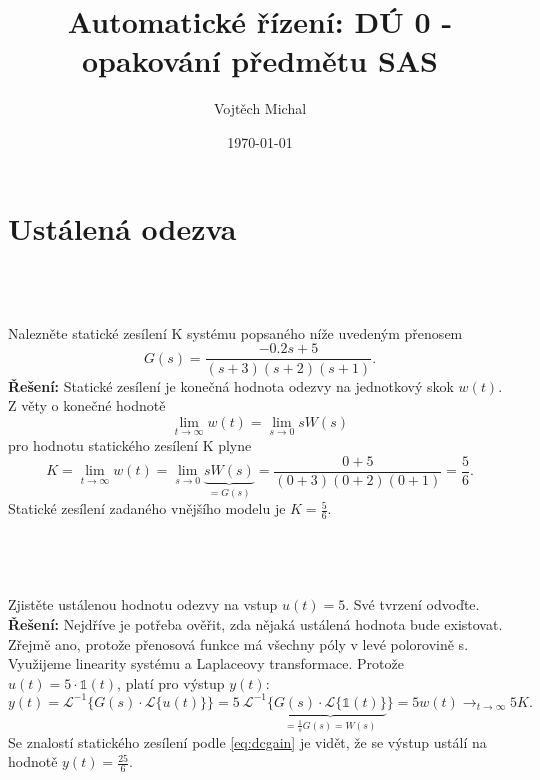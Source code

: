 \documentclass[twoside]{article}
\title{Automatické řízení: DÚ 0 - opakování předmětu SAS}
\author{Vojtěch Michal}
\date{\today}
\begin{document}
\maketitle

\section{Ustálená odezva}
\label{sec:ukol1}

\subsection{~}
\label{sec:ukol1:1}
Nalezněte statické zesílení K systému popsaného níže uvedeným přenosem
\begin{equation}
	G(s) = \frac{-0.2s+5}{(s+3)(s+2)(s+1)}.
\end{equation}
\textbf{Řešení:} Statické zesílení je konečná hodnota odezvy na jednotkový skok $w(t)$. Z věty o konečné hodnotě
\begin{equation}
	\lim_{t \to \infty}w(t) = \lim_{s \to 0}sW(s)
\end{equation}
pro hodnotu statického zesílení K plyne
\begin{equation}
	\label{eq:dcgain}
	K = \lim_{t \to \infty}w(t) = \lim_{s \to 0}{\underbrace{sW(s)}_{=G(s)}} = \frac{0+5}{(0+3)(0+2)(0+1)} = \frac{5}{6}.
\end{equation}
Statické zesílení zadaného vnějšího modelu je $K = \frac{5}{6}$.

\subsection{~}
Zjistěte ustálenou hodnotu odezvy na vstup $u (t) = 5$. Své tvrzení odvoďte. \\
\textbf{Řešení:} Nejdříve je potřeba ověřit, zda nějaká ustálená hodnota bude existovat. Zřejmě ano, protože přenosová funkce má všechny póly
v levé polorovině s. Využijeme linearity systému a Laplaceovy transformace. Protože $u(t) = 5\cdot \mathbb{1}(t)$, platí pro výstup $y(t)$:
\begin{equation}
	y(t) = \mathcal{L}^{-1}\{G(s) \cdot \mathcal{L}\{u(t)\}\} = 5~\mathcal{L}^{-1}\{\underbrace{G(s) \cdot \mathcal{L}\{\mathbb{1}(t)\}}_{= \frac{1}{s}G(s)=W(s)}\}
	= 5 w(t) \longrightarrow_{t \to \infty} 5 K.
\end{equation}
Se znalostí statického zesílení podle \eqref{eq:dcgain} je vidět, že se výstup ustálí na hodnotě $y(t)=\frac{25}{6}$.
\end{document}

